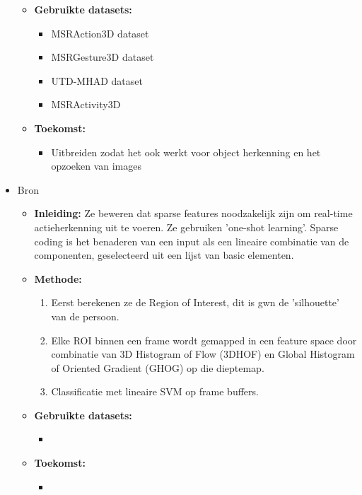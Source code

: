 \begin{itemize}
\begin{itemize}
\begin{enumerate}
		\end{enumerate}
		\item \textbf{Gebruikte datasets:}
		\begin{itemize}
			\item MSRAction3D dataset
			\item MSRGesture3D dataset
			\item UTD-MHAD dataset
			\item MSRActivity3D
		\end{itemize}
		\item \textbf{Toekomst:}
		\begin{itemize}
			\item Uitbreiden zodat het ook werkt voor object herkenning en het opzoeken van images
		\end{itemize}
	\end{itemize}
	\item Bron \cite{Fanello2017}
	\begin{itemize}
		\item \textbf{Inleiding:} Ze beweren dat sparse features noodzakelijk zijn om real-time actieherkenning uit te voeren. Ze gebruiken 'one-shot learning'. Sparse coding is het benaderen van een input als een lineaire combinatie van de componenten, geselecteerd uit een lijst van basic elementen.
		\item \textbf{Methode:} 
		\begin{enumerate}
			\item Eerst berekenen ze de Region of Interest, dit is gwn de 'silhouette' van de persoon.
			\item Elke ROI binnen een frame wordt gemapped in een feature space door combinatie van 3D Histogram of Flow (3DHOF) en Global Histogram of Oriented Gradient (GHOG) op die dieptemap. 
			\item Classificatie met lineaire SVM op frame buffers.
		\end{enumerate}
		\item \textbf{Gebruikte datasets:}
		\begin{itemize}
			\item 
		\end{itemize}
		\item \textbf{Toekomst:}
		\begin{itemize}
			\item
		\end{itemize}
	\end{itemize}
	

\end{itemize}
